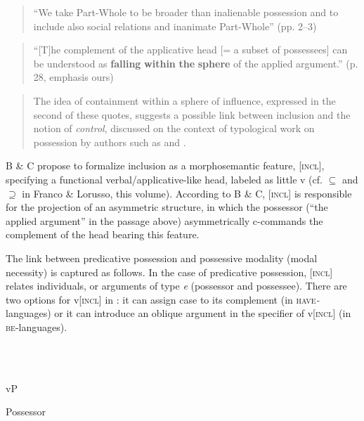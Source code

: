 \documentclass[output=paper,colorlinks,citecolor=brown]{./langscibook}
\begin{document}
\begin{quote}
“We take Part-Whole to be broader than inalienable possession and to include also social relations and inanimate Part-Whole” (pp. 2–3) 
\end{quote}

\begin{quote}
“[T]he complement of the applicative head [= a subset of possessees] can be understood as \textbf{falling} \textbf{within} \textbf{the} \textbf{sphere} of the applied argument.” (p. 28, emphasis ours) 
\end{quote}

\begin{quote}
The idea of containment within a sphere of influence, expressed in the second of these quotes, suggests a possible link between inclusion and the notion of \textit{control}, discussed on the context of typological work on possession by authors such as \citet{Heine1997} and \citet{Stassen2009}. \citep[33-34]{BjorkmanCowper2016}
\end{quote}

B \& C propose to formalize inclusion as a morphosemantic feature, [\textsc{incl}], specifying a functional verbal/applicative-like head, labeled as little v (cf. ${\subseteq}$ and ${\supseteq}$ in Franco \& Lorusso, this volume). According to B \& C, [\textsc{incl}] is responsible for the projection of an asymmetric structure, in which the possessor (“the applied argument” in the passage above) asymmetrically c-commands the complement of the head bearing this feature.  

The link between predicative possession and possessive modality (modal necessity) is captured as follows. In the case of predicative possession, [\textsc{incl]} relates individuals, or arguments of type \textit{e} (possessor and possessee). There are two options for v[\textsc{incl}] in : it can assign case to its complement (in \textsc{have}\textit{{}-}languages) or it can introduce an oblique argument in the specifier of v[\textsc{incl}] (in \textsc{be}{}-languages). 

\ea%
    \label{ex:tsedryk:3}
    \gll\\
        \\
    \glt
    \z

            vP    


  Possessor    
\end{document}

